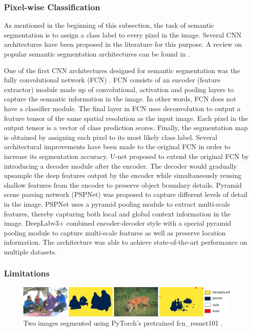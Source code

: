 \subsubsection{Pixel-wise Classification}

As mentioned in the beginning of this subsection, the task of semantic segmentation is to assign a class label to every pixel in the image. Several CNN architectures have been proposed in the literature for this purpose. A review on popular semantic segmentation architectures can be found in \textcite{taghanaki2021deep}.

One of the first CNN architectures designed for semantic segmentation was the fully convolutional network (FCN) \parencite{long2015fully}. FCN consists of an encoder (feature extractor) module made up of convolutional, activation and pooling layers to capture the semantic information in the image. In other words, FCN does not have a classifier module. The final layer in FCN uses deconvolution to output a feature tensor of the same spatial resolution as the input image. Each pixel in the output tensor is a vector of class prediction scores. Finally, the segmentation map is obtained by assigning each pixel to its most likely class label. Several architectural improvements have been made to the original FCN in order to increase its segmentation accuracy. U-net \parencite{ronneberger2015u} proposed to extend the original FCN by introducing a decoder module after the encoder. The decoder would gradually upsample the deep features output by the encoder while simultaneously reusing shallow features from the encoder to preserve object boundary details. Pyramid scene parsing network (PSPNet) \parencite{zhao2017pyramid} was proposed to capture different levels of detail in the image. PSPNet uses a pyramid pooling module to extract multi-scale features, thereby capturing both local and global context information in the image. DeepLabv3+ \parencite{chen2018encoder} combined encoder-decoder style with a special pyramid pooling module to capture multi-scale features as well as preserve location information. The architecture was able to achieve state-of-the-art performance on multiple datasets.

\subsubsection{Limitations}

\begin{figure}[t]
    \centering
    \includegraphics[width=\textwidth]{figures/semantic.pdf}
    \caption{Two images segmented using PyTorch's pretrained fcn\_resnet101 \parencite{paszke2019pytorch}.}
    \label{fig:semantic_segmentation}
\end{figure}

